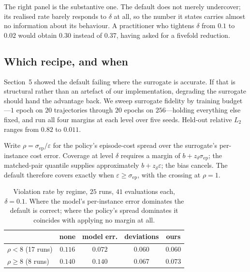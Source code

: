 The right panel is the substantive one. The default does not merely undercover;
its realised rate barely responds to $\delta$ at all, so the number it states
carries almost no information about its behaviour. A practitioner who tightens
$\delta$ from $0.1$ to $0.02$ would obtain $0.30$ instead of $0.37$, having
asked for a fivefold reduction.

\subsection{Which recipe, and when}
\label{sec:crossover}

Section~5 showed the default failing where the surrogate is accurate. If that
is structural rather than an artefact of our implementation, degrading the
surrogate should hand the advantage back. We sweep surrogate fidelity by
training budget---$1$ epoch on $20$ trajectories through $20$ epochs on
$256$---holding everything else fixed, and run all four margins at each level
over five seeds. Held-out relative $L_2$ ranges from $0.82$ to $0.011$.

Write $\rho = \sigma_{\mathrm{ep}} / \varepsilon$ for the policy's episode-cost
spread over the surrogate's per-instance cost error. Coverage at level $\delta$
requires a margin of $b + z_\delta \sigma_{\mathrm{ep}}$; the matched-pair
quantile supplies approximately $b + z_\delta \varepsilon$; the bias cancels.
The default therefore covers exactly when $\varepsilon \ge \sigma_{\mathrm{ep}}$,
with the crossing at $\rho = 1$.

\begin{table}[t]
\caption{Violation rate by regime, $25$ runs, $41$ evaluations each,
$\delta = 0.1$. Where the model's per-instance error dominates the default is
correct; where the policy's spread dominates it coincides with applying no
margin at all.}
\label{tab:crossover}
\centering\small
\begin{tabular}{lcccc}
\toprule
& none & model err. & deviations & \textbf{ours} \\
\midrule
$\rho<8$ \small(17 runs) & $0.116$ & $\mathbf{0.072}$ & $0.060$ & $0.060$ \\
$\rho\ge8$ \small(8 runs) & $0.140$ & $\mathbf{0.140}$ & $0.067$ & $0.073$ \\
\bottomrule
\end{tabular}
\end{table}

